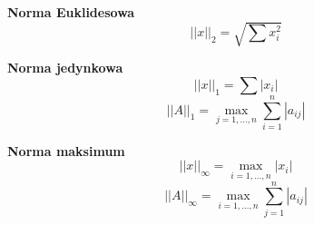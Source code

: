\documentclass[../mn-notatki.tex]{subfiles}
\begin{document}
\begin{tcolorbox}
\textbf{Norma Euklidesowa}
\[
||x||_2 = \sqrt{\sum x_i^2}
\]
\end{tcolorbox}

\begin{tcolorbox}
\textbf{Norma jedynkowa}
\[
||x||_1 = \sum |x_i|
\]
\[
||A||_1 = \max_{j = 1, \ldots, n} \sum_{i = 1}^{n} |a_{ij}|
\]
\end{tcolorbox}

\begin{tcolorbox}
\textbf{Norma maksimum}
\[
||x||_\infty = \max_{i = 1, \ldots, n} |x_i|
\]
\[
||A||_\infty = \max_{i = 1, \ldots, n} \sum_{j = 1}^{n} |a_{ij}|
\]
\end{tcolorbox}

\pagebreak
\end{document}
